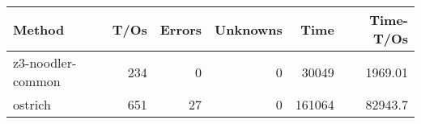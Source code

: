 \begin{tabular}{lrrrrr}
\hline
 Method            &   T/Os &   Errors &   Unknowns &   Time &   Time-T/Os \\
\hline
 z3-noodler-common &    234 &        0 &          0 &  30049 &     1969.01 \\
 ostrich           &    651 &       27 &          0 & 161064 &    82943.7  \\
\hline
\end{tabular}
